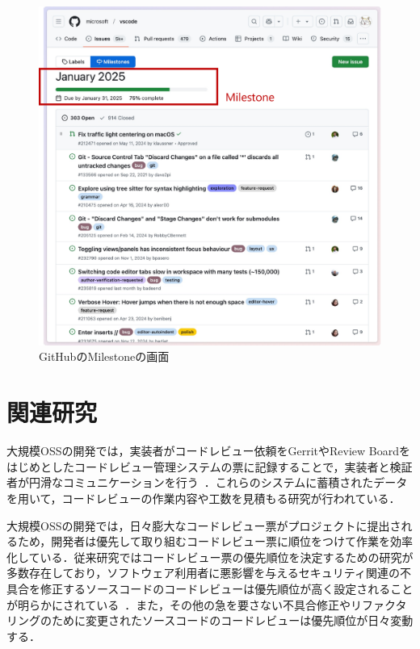 \documentclass[11pt]{jreport}
\begin{document}
\begin{figure}[t]
\centerline{\includegraphics[width=0.9\linewidth]{@BSthesis2024_Kawasaki/BSthesis2024_Kawasaki_fig/milestone.pdf}}
\caption{GitHubのMilestoneの画面}
\label{fig:milestone}
\end{figure}

\section{関連研究}
大規模OSSの開発では，実装者がコードレビュー依頼をGerritやReview Boardをはじめとしたコードレビュー管理システムの票に記録することで，実装者と検証者が円滑なコミュニケーションを行う~\cite{code_review}．これらのシステムに蓄積されたデータを用いて，コードレビューの作業内容や工数を見積もる研究が行われている．

大規模OSSの開発では，日々膨大なコードレビュー票がプロジェクトに提出されるため，開発者は優先して取り組むコードレビュー票に順位をつけて作業を効率化している．従来研究ではコードレビュー票の優先順位を決定するための研究が多数存在しており，ソフトウェア利用者に悪影響を与えるセキュリティ関連の不具合を修正するソースコードのコードレビューは優先順位が高く設定されることが明らかにされている~\cite{integrator}\cite{review_prioritize_pineapple}．また，その他の急を要さない不具合修正やリファクタリングのために変更されたソースコードのコードレビューは優先順位が日々変動する\cite{review_priority_next_day}．
\end{document}
